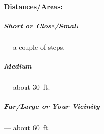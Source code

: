 \documentclass[itdr]{subfiles}
\begin{document}
\vfill
\break

\begin{dbox}
	\paragraph{Distances/Areas:}
	\subparagraph{Short or Close/Small} --- a couple of steps.
	\subparagraph{Medium} --- about 30~ft.
	\subparagraph{Far/Large or Your Vicinity} --- about 60~ft.
\end{dbox}


\vfill
\break

\end{document}
